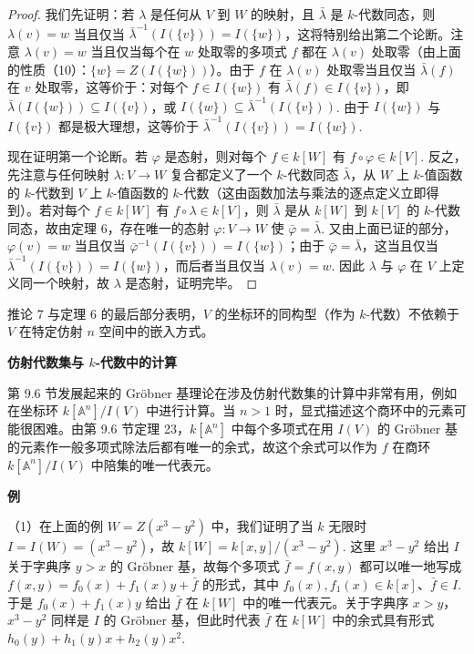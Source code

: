 \begin{proof}
我们先证明：若 \(\lambda\) 是任何从 \(V\) 到 \(W\) 的映射，且 \(\bar\lambda\) 是 \(k\)-代数同态，则 \(\lambda(v) = w\) 当且仅当 \(\bar\lambda^{-1}(I(\{v\})) = I(\{w\})\)，这将特别给出第二个论断。注意 \(\lambda(v) = w\) 当且仅当每个在 \(w\) 处取零的多项式 \(f\) 都在 \(\lambda(v)\) 处取零（由上面的性质（10）：\(\{w\} = Z(I(\{w\}))\)）。由于 \(f\) 在 \(\lambda(v)\) 处取零当且仅当 \(\bar\lambda(f)\) 在 \(v\) 处取零，这等价于：对每个 \(f \in I(\{w\})\) 有 \(\bar\lambda(f) \in I(\{v\})\)，即 \(\bar\lambda(I(\{w\})) \subseteq I(\{v\})\)，或 \(I(\{w\}) \subseteq \bar\lambda^{-1}(I(\{v\}))\). 由于 \(I(\{w\})\) 与 \(I(\{v\})\) 都是极大理想，这等价于 \(\bar\lambda^{-1}(I(\{v\})) = I(\{w\})\).

现在证明第一个论断。若 \(\varphi\) 是态射，则对每个 \(f \in k[W]\) 有 \(f \circ \varphi \in k[V]\). 反之，先注意与任何映射 \(\lambda : V \to W\) 复合都定义了一个 \(k\)-代数同态 \(\bar\lambda\)，从 \(W\) 上 \(k\)-值函数的 \(k\)-代数到 \(V\) 上 \(k\)-值函数的 \(k\)-代数（这由函数加法与乘法的逐点定义立即得到）。若对每个 \(f \in k[W]\) 有 \(f\circ\lambda \in k[V]\)，则 \(\bar\lambda\) 是从 \(k[W]\) 到 \(k[V]\) 的 \(k\)-代数同态，故由定理 6，存在唯一的态射 \(\varphi : V \to W\) 使 \(\bar\varphi = \bar\lambda\). 又由上面已证的部分，\(\varphi(v) = w\) 当且仅当 \(\bar\varphi^{-1}(I(\{v\})) = I(\{w\})\)；由于 \(\bar\varphi = \bar\lambda\)，这当且仅当 \(\bar\lambda^{-1}(I(\{v\})) = I(\{w\})\)，而后者当且仅当 \(\lambda(v) = w\). 因此 \(\lambda\) 与 \(\varphi\) 在 \(V\) 上定义同一个映射，故 \(\lambda\) 是态射，证明完毕。
\end{proof}

推论 7 与定理 6 的最后部分表明，\(V\) 的坐标环的同构型（作为 \(k\)-代数）不依赖于 \(V\) 在特定仿射 \(n\) 空间中的嵌入方式。

\noindent\textbf{仿射代数集与 \(k\)-代数中的计算}

第 9.6 节发展起来的 Gröbner 基理论在涉及仿射代数集的计算中非常有用，例如在坐标环 \(k[\mathbb{A}^n]/I(V)\) 中进行计算。当 \(n > 1\) 时，显式描述这个商环中的元素可能很困难。由第 9.6 节定理 23，\(k[\mathbb{A}^n]\) 中每个多项式在用 \(I(V)\) 的 Gröbner 基的元素作一般多项式除法后都有唯一的余式，故这个余式可以作为 \(f\) 在商环 \(k[\mathbb{A}^n]/I(V)\) 中陪集的唯一代表元。

\noindent\textbf{例}

（1）在上面的例 \(W = Z(x^3-y^2)\) 中，我们证明了当 \(k\) 无限时 \(I = I(W) = (x^3-y^2)\)，故 \(k[W] = k[x,y]/(x^3-y^2)\). 这里 \(x^3-y^2\) 给出 \(I\) 关于字典序 \(y > x\) 的 Gröbner 基，故每个多项式 \(\bar f = f(x,y)\) 都可以唯一地写成 \(f(x,y) = f_0(x)+f_1(x)y+\bar f\) 的形式，其中 \(f_0(x), f_1(x) \in k[x]\)、\(\bar f \in I\). 于是 \(f_0(x)+f_1(x)y\) 给出 \(\bar f\) 在 \(k[W]\) 中的唯一代表元。关于字典序 \(x > y\)，\(x^3-y^2\) 同样是 \(I\) 的 Gröbner 基，但此时代表 \(\bar f\) 在 \(k[W]\) 中的余式具有形式 \(h_0(y)+h_1(y)x+h_2(y)x^2\).


